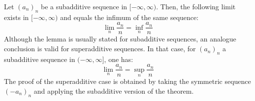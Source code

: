 \documentclass[12pt]{article}
\begin{document}
Let $(a_n)_n$ be a subadditive sequence in $[-\infty,\infty)$. Then, the following limit exists in $[-\infty,\infty)$ and equals the infimum of the same sequence:
$$\lim_{n} \frac{a_n}{n}= \inf_n \frac{a_n}{n}$$
Although the lemma is usually stated for subadditive sequences, an analogue conclusion is valid for superadditive sequences. In that case, for $(a_n)_n$ a subadditive sequence in $(-\infty,\infty]$, one has:
$$\lim_n \frac{a_n}{n}=\sup_n \frac{a_n}{n}$$
The proof of the superadditive case is obtained by taking the symmetric sequence $(-a_n)_n$ and applying the subadditive version of the theorem.
\end{document}
